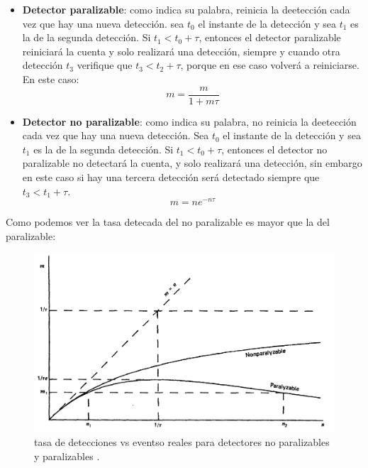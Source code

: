 \begin{itemize}
    \begin{itemize}
        \item \textbf{Detector paralizable}: como indica su palabra, reinicia la deetección cada vez que hay una nueva detección. sea $t_0$ el instante de la detección y sea $t_1$ es la de la segunda detección. Si $t_1<t_0+\tau$, entonces el detector paralizable reiniciará la cuenta y solo realizará una detección, siempre y cuando otra detección $t_3$ verifique que $t_3<t_2+\tau$, porque en ese caso volverá a reiniciarse. En este caso:
        \begin{equation}
            m = \frac{m}{1+m\tau}
        \end{equation}
        \item \textbf{Detector no paralizable}: como indica su palabra, no reinicia la deetección cada vez que hay una nueva detección. Sea $t_0$ el instante de la detección y sea $t_1$ es la de la segunda detección. Si $t_1<t_0+\tau$, entonces el detector no paralizable no detectará la cuenta, y solo realizará una detección, sin embargo en este caso si hay una tercera detección será detectado siempre que $t_3<t_1+\tau$. 
        \begin{equation}
            m = n e^{-n \tau}
        \end{equation}
    \end{itemize}
    Como podemos ver la tasa detecada del no paralizable es mayor que la del paralizable: 
    \begin{figure}[H] \centering
        \caption{tasa de detecciones vs eventso reales para detectores no paralizables y paralizables \cite{Knoll:1300754}.}
        \includegraphics[width=0.7\linewidth]{Cuerpo/Ch_01/Detectores_muerto.png}
    \end{figure}
    
\end{itemize}
